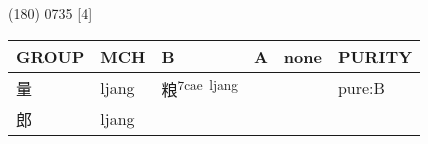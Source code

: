 \documentclass[14pt,a4paper]{scrartcl}
\begin{document}
(180) 0735 {[}4{]}

\begin{longtable}[c]{@{}llllll@{}}
\toprule
\begin{minipage}[b]{0.14\columnwidth}\raggedright\strut
GROUP
\strut\end{minipage} &
\begin{minipage}[b]{0.14\columnwidth}\raggedright\strut
MCH
\strut\end{minipage} &
\begin{minipage}[b]{0.14\columnwidth}\raggedright\strut
B
\strut\end{minipage} &
\begin{minipage}[b]{0.14\columnwidth}\raggedright\strut
A
\strut\end{minipage} &
\begin{minipage}[b]{0.14\columnwidth}\raggedright\strut
none
\strut\end{minipage} &
\begin{minipage}[b]{0.14\columnwidth}\raggedright\strut
PURITY
\strut\end{minipage}\tabularnewline
\midrule
\endhead
\begin{minipage}[t]{0.14\columnwidth}\raggedright\strut
量
\strut\end{minipage} &
\begin{minipage}[t]{0.14\columnwidth}\raggedright\strut
ljang
\strut\end{minipage} &
\begin{minipage}[t]{0.14\columnwidth}\raggedright\strut
粮\textsuperscript{7cae~ljang}
\strut\end{minipage} &
\begin{minipage}[t]{0.14\columnwidth}\raggedright\strut
\strut\end{minipage} &
\begin{minipage}[t]{0.14\columnwidth}\raggedright\strut
\strut\end{minipage} &
\begin{minipage}[t]{0.14\columnwidth}\raggedright\strut
pure:B
\strut\end{minipage}\tabularnewline
\begin{minipage}[t]{0.14\columnwidth}\raggedright\strut
郎
\strut\end{minipage} &
\begin{minipage}[t]{0.14\columnwidth}\raggedright\strut
ljang
\strut\end{minipage} &
\begin{minipage}[t]{0.14\columnwidth}\raggedright\strut
\strut\end{minipage} &

\end{longtable}
\end{document}
